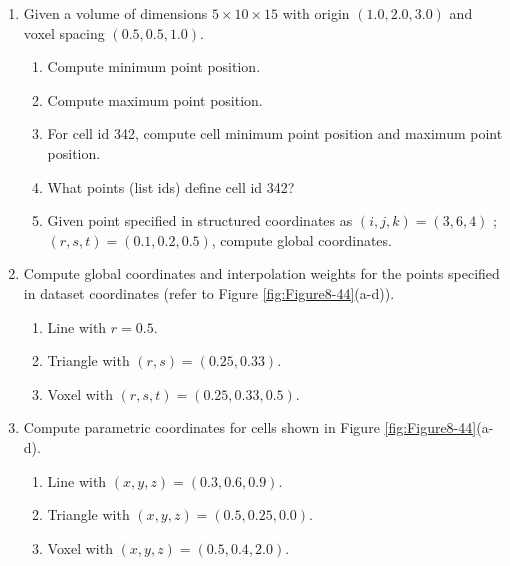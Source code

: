 \begin{enumerate}

\item Given a volume of dimensions $5 \times 10 \times 15$ with origin $(1.0, 2.0,3.0)$ and voxel spacing $(0.5, 0.5, 1.0)$.
    \begin{enumerate}

    \item Compute minimum point position.

    \item Compute maximum point position.

    \item For cell id 342, compute cell minimum point position and maximum point position.

    \item What points (list ids) define cell id 342?

    \item Given point specified in structured coordinates as $(i, j, k) = (3, 6, 4)$ ;$(r, s, t) = (0.1, 0.2, 0.5)$, compute global coordinates.

    \end{enumerate}

\item Compute global coordinates and interpolation weights for the points specified in dataset coordinates (refer to Figure \ref{fig:Figure8-44}(a-d)).
    \begin{enumerate}

    \item Line with $r = 0.5$.

    \item Triangle with $(r, s) = (0.25, 0.33)$.

    \item Voxel with $(r, s, t) = (0.25, 0.33, 0.5)$.

    \end{enumerate}

\item Compute parametric coordinates for cells shown in Figure \ref{fig:Figure8-44}(a-d).
    \begin{enumerate}

    \item Line with $(x, y, z) = (0.3, 0.6, 0.9)$.

    \item Triangle with $(x, y, z) = (0.5, 0.25, 0.0)$.

    \item Voxel with $(x, y, z) = (0.5, 0.4, 2.0)$.


\end{enumerate}
\end{enumerate}
